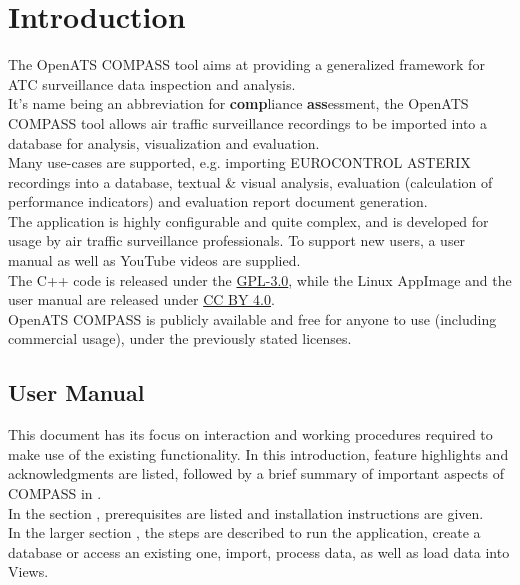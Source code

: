 \chapter{Introduction}

The OpenATS COMPASS tool aims at providing a generalized framework for ATC surveillance data inspection and analysis. \\

It’s name being an abbreviation for \textbf{comp}liance \textbf{ass}essment, the OpenATS COMPASS tool allows air traffic surveillance recordings to be imported into a database for analysis, visualization and evaluation. \\

Many use-cases are supported, e.g. importing EUROCONTROL ASTERIX recordings into a database, textual \& visual analysis, evaluation (calculation of performance indicators) and evaluation report document generation. \\

The application is highly configurable and quite complex, and is developed for usage by air traffic surveillance professionals. To support new users, a user manual as well as YouTube videos are supplied. \\

The C++ code is released under the \href{https://www.gnu.org/licenses/gpl-3.0.en.html}{GPL-3.0}, while the Linux AppImage and the user manual are released under \href{https://creativecommons.org/licenses/by/4.0/}{CC BY 4.0}. \\

OpenATS COMPASS is publicly available and free for anyone to use (including commercial usage), under the previously stated licenses.

\section{User Manual}

This document has its focus on interaction and working procedures required to make use of the existing
functionality. In this introduction, feature highlights and acknowledgments are listed, followed by a brief summary of important aspects of  COMPASS in . \\

In the section , prerequisites are listed and installation instructions are given. \\

In the larger section , the steps are described to run the application, create a database or access an existing one, import, process data, as well as load data into Views. \\

